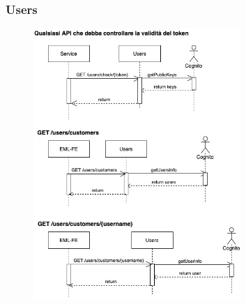 \subsubsection{Users}
\begin{figure}[H]
    \includegraphics[width=0.7\textwidth]{res/images/sequence-diagrams/users.jpg}
\end{figure}